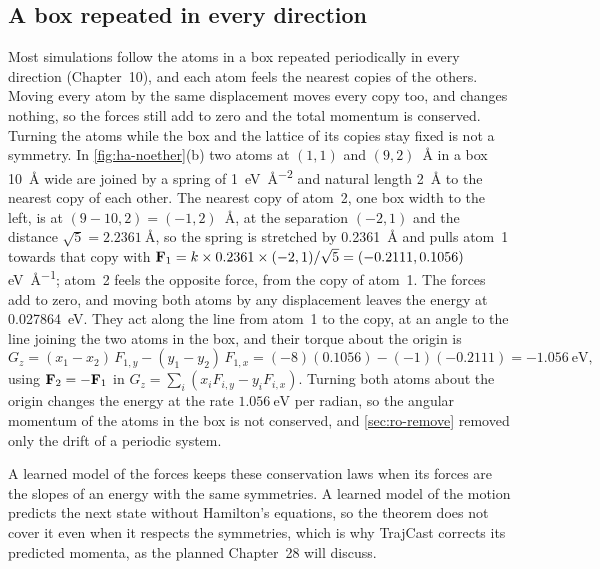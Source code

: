 \subsection*{A box repeated in every direction}

Most simulations follow the atoms in a box repeated periodically in every
direction (Chapter~10), and each atom feels the nearest copies of the
others. Moving every atom by the same displacement moves every copy too,
and changes nothing, so the forces still add to zero and the total
momentum is conserved. Turning the atoms while the box and the lattice of
its copies stay fixed is not a symmetry. In \cref{fig:ha-noether}(b) two
atoms at $(1, 1)$ and $(9, 2)$~\si{\angstrom} in a box \SI{10}{\angstrom}
wide are joined by a spring of \SI{1}{\electronvolt\per\angstrom\squared}
and natural length \SI{2}{\angstrom} to the nearest copy of each other.
The nearest copy of atom~2, one box width to the left, is at $(9 - 10,
2) = (-1, 2)$~\si{\angstrom}, at the
separation $(-2, 1)$ and the distance $\sqrt5 = \SI{2.2361}{\angstrom}$, so
the spring is stretched by \SI{0.2361}{\angstrom} and pulls atom~1 towards
that copy with $\bm{\mathrm{F}}_1 = k\times0.2361\times(-2, 1)/\sqrt5 = (-0.2111,
0.1056)$
\si{\electronvolt\per\angstrom}; atom~2 feels the opposite force, from the
copy of atom~1. The forces add to zero, and moving both atoms by any
displacement leaves the energy at \SI{0.027864}{\electronvolt}. They act along
the line from atom~1 to the copy, at an angle to the line joining the two
atoms in the box, and their torque about the origin is
\begin{equation*}
   G_z = (x_1 - x_2)\,F_{1,y} - (y_1 - y_2)\,F_{1,x}
   = (-8)(0.1056) - (-1)(-0.2111) = \SI{-1.056}{\electronvolt} ,
\end{equation*}
using $\bm{\mathrm{F}}_2 = -\bm{\mathrm{F}}_1$ in $G_z = \sum_i(x_iF_{i,y} - y_iF_{i,x})$.
Turning both atoms about the origin changes the energy at the rate
$\SI{1.056}{\electronvolt}$ per radian, so the angular momentum of the
atoms in the box is not conserved, and \cref{sec:ro-remove} removed only
the drift of a periodic system.

A learned model of the forces keeps these conservation laws when its
forces are the slopes of an energy with the same symmetries. A learned
model of the motion predicts the next state without Hamilton's equations,
so the theorem does not cover it even when it respects the symmetries,
which is why TrajCast corrects its predicted momenta, as the planned
Chapter~28 will discuss.

